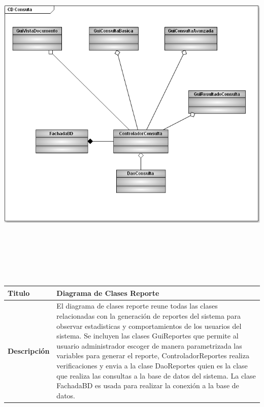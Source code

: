 	\begin{minipage}[c]{1\linewidth}
	\centering
	\includegraphics[width=20cm, height=17cm, angle=90]{diagramasClase/DiagramaClases3}
	\end{minipage}
			
	
			
	
		
	\begin{tabular}{|p{5cm}|p{11cm}|}\hline
	{\bf Titulo} & {Diagrama de Clases Reporte}\\
	\hline
	{\bf Descripción} & {El diagrama de clases reporte reune todas las clases
	relacionadas con la generación de reportes del sistema para observar estadisticas y
	comportamientos de los usuarios del sistema.\newline
	Se incluyen las clases GuiReportes que permite al usuario administrador escoger de manera
	parametrizada las variables para generar el reporte, ControladorReportes realiza
	verificaciones y envia a la clase DaoReportes quien es la clase que realiza las consultas a
	la base de datos del sistema. La clase FachadaBD es usada para realizar la conexión a la
	base de datos.}\\
	\hline
	\end{tabular}\\[.5cm]
		
